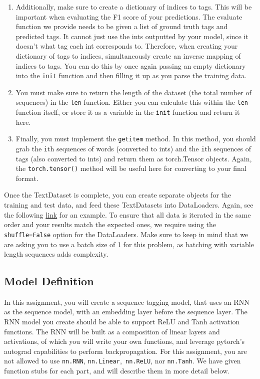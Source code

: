 \documentclass[11pt,addpoints,answers]{exam}
\begin{document}
\begin{enumerate}
    \item Additionally, make sure to create a dictionary of indices to tags. This will be important when evaluating the F1 score of your predictions. The evaluate function we provide needs to be given a list of ground truth tags and predicted tags. It cannot just use the ints outputted by your model, since it doesn't what tag each int corresponds to. Therefore, when creating your dictionary of tags to indices, simultaneously create an inverse mapping of indices to tags. You can do this by once again passing an empty dictionary into the \texttt{init} function and then filling it up as you parse the training data. 
    \item You must make sure to return the length of the dataset (the total number of sequences) in the \texttt{len} function. Either you can calculate this within the \texttt{len} function itself, or store it as a variable in the \texttt{init} function and return it here.
    \item Finally, you must implement the \texttt{getitem} method. In this method, you should grab the \texttt{i}th sequences of words (converted to ints) and the \texttt{i}th sequences of tags (also converted to ints) and return them as torch.Tensor objects. Again, the \texttt{torch.tensor()} method will be useful here for converting to your final format.
\end{enumerate}

Once the TextDataset is complete, you can create separate objects for the training and test data, and feed these TextDatasets into DataLoaders. Again, see the following \href{https://pytorch.org/tutorials/beginner/basics/data_tutorial.html}{link} for an example. To ensure that all data is iterated in the same order and your results match the expected ones, we require using the \texttt{shuffle=False} option for the DataLoaders. Make sure to keep in mind that we are asking you to use a batch size of 1 for this problem, as batching with variable length sequences adds complexity.


\subsection{Model Definition}\label{model}
In this assignment, you will create a sequence tagging model, that uses an RNN as the sequence model, with an embedding layer before the sequence layer. The RNN model you create should be able to support ReLU and Tanh activation functions. The RNN will be built as a composition of linear layers and activations, of which you will write your own functions, and leverage pytorch's autograd capabilities to perform backpropagation. For this assignment, you are not allowed to use \texttt{nn.RNN}, \texttt{nn.Linear},\texttt{ nn.ReLU}, nor \texttt{nn.Tanh}. We have given function stubs for each part, and will describe them in more detail below.
\end{document}
